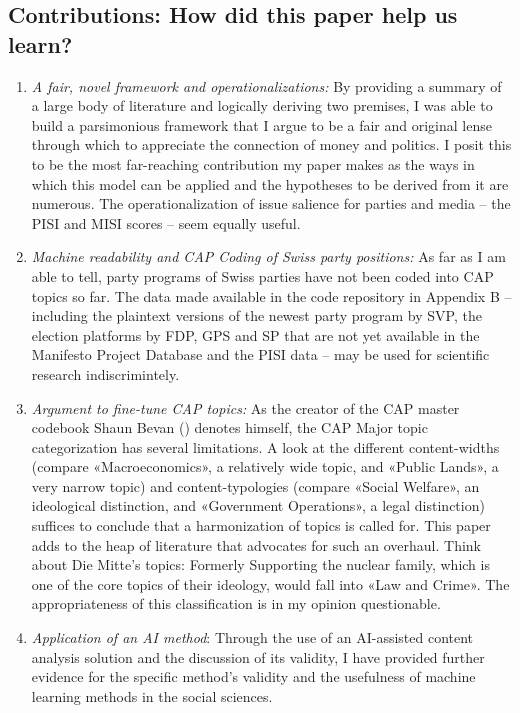 \documentclass[11pt,a4paper]{article}
\begin{document}
\subsection{Contributions: How did this paper help us learn?}
\begin{enumerate}
    \item  \textit{A fair, novel framework and operationalizations:} By providing a summary of a large body of literature and logically deriving two premises, I was able to build a parsimonious framework that I argue to be a fair and original lense through which to appreciate the connection of money and politics. I posit this to be the most far-reaching contribution my paper makes as the ways in which this model can be applied and the hypotheses to be derived from it are numerous. The operationalization of issue salience for parties and media – the PISI and MISI scores – seem equally useful.

    \item \textit{Machine readability and CAP Coding of Swiss party positions:} As far as I am able to tell, party programs of Swiss parties have not been coded into CAP topics so far. The data made available in the code repository in Appendix B – including the plaintext versions of the newest party program by SVP, the election platforms by FDP, GPS and SP that are not yet available in the Manifesto Project Database and the PISI data – may be used for scientific research indiscrimintely. 

    \item \textit{Argument to fine-tune CAP topics:} As the creator of the CAP master codebook Shaun Bevan (\citeyear{bevan_gone_2019}) denotes himself, the CAP Major topic categorization has several limitations. A look at the different content-widths (compare «Macroeconomics», a relatively wide topic, and «Public Lands», a very narrow topic) and content-typologies (compare «Social Welfare», an ideological distinction, and «Government Operations», a legal distinction) suffices to conclude that a harmonization of topics is called for. This paper adds to the heap of literature that advocates for such an overhaul. Think about Die Mitte’s topics: Formerly Supporting the nuclear family, which is one of the core topics of their ideology, would fall into «Law and Crime». The appropriateness of this classification is in my opinion questionable. 

    \item \textit{Application of an AI method}: Through the use of an AI-assisted content analysis solution and the discussion of its validity, I have provided further evidence for the specific method’s validity and the usefulness of machine learning methods in the social sciences.

\end{enumerate}
\end{document}
